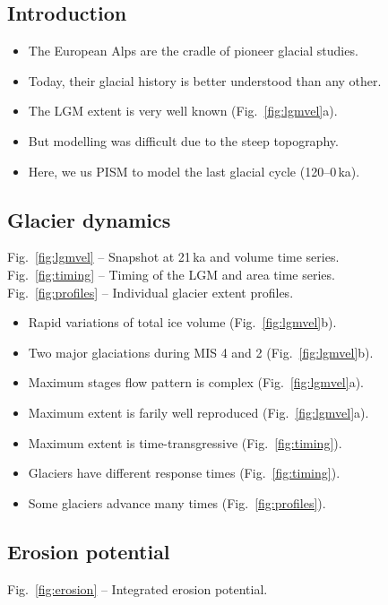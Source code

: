 \documentclass{article}
\begin{document}
\subsection{Introduction}

    \begin{itemize}
    \item The European Alps are the cradle of pioneer glacial studies.
    \item Today, their glacial history is better understood than any other.
    \item The LGM extent is very well known (Fig.~\ref{fig:lgmvel}a).
    \item But modelling was difficult due to the steep topography.
    \item Here, we us PISM to model the last glacial cycle (120--0\,ka).
    \end{itemize}

\subsection{Glacier dynamics}
    Fig.~\ref{fig:lgmvel} -- Snapshot at 21\,ka and volume time series.\\
    Fig.~\ref{fig:timing} -- Timing of the LGM and area time series.\\
    Fig.~\ref{fig:profiles} -- Individual glacier extent profiles.

    \begin{itemize}
    \item Rapid variations of total ice volume (Fig.~\ref{fig:lgmvel}b).
    \item Two major glaciations during MIS 4 and 2 (Fig.~\ref{fig:lgmvel}b).
    \item Maximum stages flow pattern is complex (Fig.~\ref{fig:lgmvel}a).
    \item Maximum extent is farily well reproduced (Fig.~\ref{fig:lgmvel}a).
    \item Maximum extent is time-transgressive (Fig.~\ref{fig:timing}).
    \item Glaciers have different response times (Fig.~\ref{fig:timing}).
    \item Some glaciers advance many times (Fig.~\ref{fig:profiles}).
    \end{itemize}

\subsection{Erosion potential}
    Fig.~\ref{fig:erosion} -- Integrated erosion potential.
\end{document}
